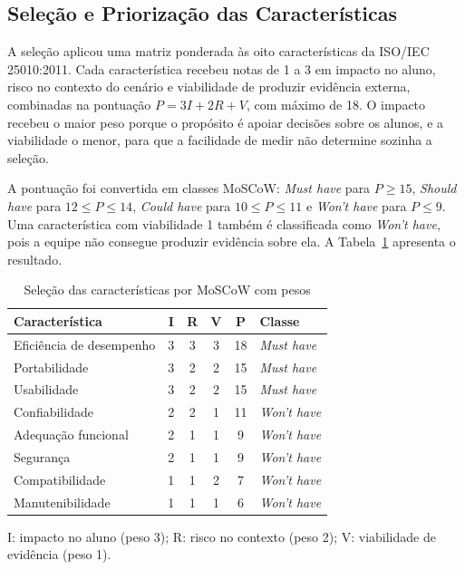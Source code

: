 \documentclass[sigconf, language=english, language=brazilian,natbib=false]{acmart}
\begin{document}
\subsection{Seleção e Priorização das Características}

A seleção aplicou uma matriz ponderada às oito características da ISO/IEC 25010:2011. Cada característica recebeu notas de 1 a 3 em impacto no aluno, risco no contexto do cenário e viabilidade de produzir evidência externa, combinadas na pontuação $P = 3I + 2R + V$, com máximo de 18. O impacto recebeu o maior peso porque o propósito é apoiar decisões sobre os alunos, e a viabilidade o menor, para que a facilidade de medir não determine sozinha a seleção.

A pontuação foi convertida em classes MoSCoW: \textit{Must have} para $P \geq 15$, \textit{Should have} para $12 \leq P \leq 14$, \textit{Could have} para $10 \leq P \leq 11$ e \textit{Won't have} para $P \leq 9$. Uma característica com viabilidade 1 também é classificada como \textit{Won't have}, pois a equipe não consegue produzir evidência sobre ela. A Tabela~\ref{tab:moscow} apresenta o resultado.

\begin{table}[htbp]
\centering
\caption{Seleção das características por MoSCoW com pesos}
\label{tab:moscow}
\scriptsize
\setlength{\tabcolsep}{4pt}
\begin{tabular}{lccccl}
\hline
\textbf{Característica} & \textbf{I} & \textbf{R} & \textbf{V} & \textbf{P} & \textbf{Classe} \\
\hline
Eficiência de desempenho & 3 & 3 & 3 & 18 & \textit{Must have} \\
Portabilidade & 3 & 2 & 2 & 15 & \textit{Must have} \\
Usabilidade & 3 & 2 & 2 & 15 & \textit{Must have} \\
Confiabilidade & 2 & 2 & 1 & 11 & \textit{Won't have} \\
Adequação funcional & 2 & 1 & 1 & 9 & \textit{Won't have} \\
Segurança & 2 & 1 & 1 & 9 & \textit{Won't have} \\
Compatibilidade & 1 & 1 & 2 & 7 & \textit{Won't have} \\
Manutenibilidade & 1 & 1 & 1 & 6 & \textit{Won't have} \\
\hline
\end{tabular}
\par\smallskip
{\scriptsize I: impacto no aluno (peso 3); R: risco no contexto (peso 2); V: viabilidade de evidência (peso 1).}
\end{table}
\end{document}
